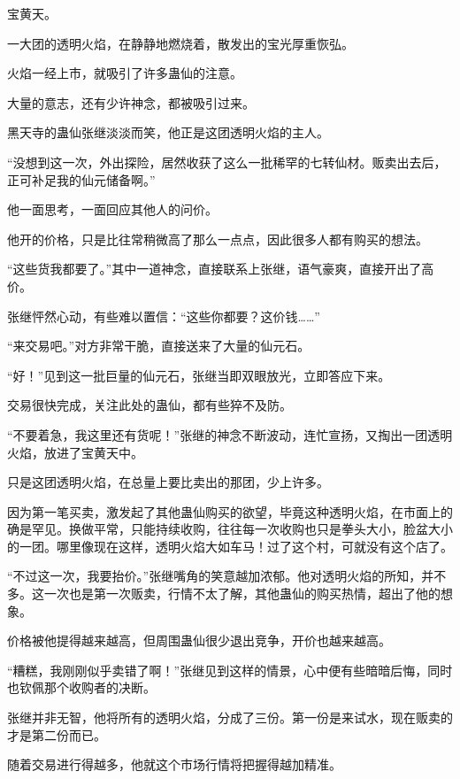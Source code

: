
\begin{this_body}



宝黄天。

一大团的透明火焰，在静静地燃烧着，散发出的宝光厚重恢弘。

火焰一经上市，就吸引了许多蛊仙的注意。

大量的意志，还有少许神念，都被吸引过来。

黑天寺的蛊仙张继淡淡而笑，他正是这团透明火焰的主人。

“没想到这一次，外出探险，居然收获了这么一批稀罕的七转仙材。贩卖出去后，正可补足我的仙元储备啊。”

他一面思考，一面回应其他人的问价。

他开的价格，只是比往常稍微高了那么一点点，因此很多人都有购买的想法。

“这些货我都要了。”其中一道神念，直接联系上张继，语气豪爽，直接开出了高价。

张继怦然心动，有些难以置信：“这些你都要？这价钱……”

“来交易吧。”对方非常干脆，直接送来了大量的仙元石。

“好！”见到这一批巨量的仙元石，张继当即双眼放光，立即答应下来。

交易很快完成，关注此处的蛊仙，都有些猝不及防。

“不要着急，我这里还有货呢！”张继的神念不断波动，连忙宣扬，又掏出一团透明火焰，放进了宝黄天中。

只是这团透明火焰，在总量上要比卖出的那团，少上许多。

因为第一笔买卖，激发起了其他蛊仙购买的欲望，毕竟这种透明火焰，在市面上的确是罕见。换做平常，只能持续收购，往往每一次收购也只是拳头大小，脸盆大小的一团。哪里像现在这样，透明火焰大如车马！过了这个村，可就没有这个店了。

“不过这一次，我要抬价。”张继嘴角的笑意越加浓郁。他对透明火焰的所知，并不多。这一次也是第一次贩卖，行情不太了解，其他蛊仙的购买热情，超出了他的想象。

价格被他提得越来越高，但周围蛊仙很少退出竞争，开价也越来越高。

“糟糕，我刚刚似乎卖错了啊！”张继见到这样的情景，心中便有些暗暗后悔，同时也钦佩那个收购者的决断。

张继并非无智，他将所有的透明火焰，分成了三份。第一份是来试水，现在贩卖的才是第二份而已。

随着交易进行得越多，他就这个市场行情将把握得越加精准。


\end{this_body}
